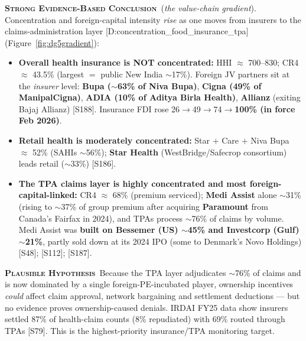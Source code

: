 \documentclass[11pt,a4paper]{article}
\newcommand{\SE}{\textcolor{secol}{\textsc{\textbf{Strong Evidence-Based Conclusion}}}}
\newcommand{\PH}{\textcolor{phcol}{\textsc{\textbf{Plausible Hypothesis}}}}
\newcommand{\cs}[1]{\textnormal{[#1]}}
\begin{document}
\SE\ (\emph{the value-chain gradient}). Concentration and foreign-capital intensity \emph{rise} as one moves from insurers to the claims-administration layer \cs{D:concentration\_food\_insurance\_tpa} (Figure~\ref{fig:dg5gradient}):
\begin{itemize}[leftmargin=1.4em,itemsep=2pt]
\item \textbf{Overall health insurance is NOT concentrated:} HHI $\approx$ 700--830; CR4 $\approx$ 43.5\% (largest $=$ public New India $\sim$17\%). Foreign JV partners sit at the \emph{insurer} level: \textbf{Bupa ($\sim$63\% of Niva Bupa)}, \textbf{Cigna (49\% of ManipalCigna)}, \textbf{ADIA (10\% of Aditya Birla Health)}, \textbf{Allianz} (exiting Bajaj Allianz) \cs{S188}. Insurance FDI rose 26$\rightarrow$49$\rightarrow$74$\rightarrow$\textbf{100\% (in force Feb 2026)}.
\item \textbf{Retail health is moderately concentrated:} Star $+$ Care $+$ Niva Bupa $\approx$ 52\% (SAHIs $\sim$56\%); \textbf{Star Health} (WestBridge/Safecrop consortium) leads retail ($\sim$33\%) \cs{S186}.
\item \textbf{The TPA claims layer is highly concentrated and most foreign-capital-linked:} CR4 $\approx$ 68\% (premium serviced); \textbf{Medi Assist} alone $\sim$31\% (rising to $\sim$37\% of group premium after acquiring \textbf{Paramount} from Canada's Fairfax in 2024), and TPAs process $\sim$76\% of claims by volume. Medi Assist was \textbf{built on Bessemer (US) $\sim$45\% and Investcorp (Gulf) $\sim$21\%}, partly sold down at its 2024 IPO (some to Denmark's Novo Holdings) \cs{S48}; \cs{S112}; \cs{S187}.
\end{itemize}

\PH\ Because the TPA layer adjudicates $\sim$76\% of claims and is now dominated by a single foreign-PE-incubated player, ownership incentives \emph{could} affect claim approval, network bargaining and settlement deductions --- but no evidence proves ownership-caused denials. IRDAI FY25 data show insurers settled 87\% of health-claim counts (8\% repudiated) with 69\% routed through TPAs \cs{S79}. This is the highest-priority insurance/TPA monitoring target.
\end{document}
